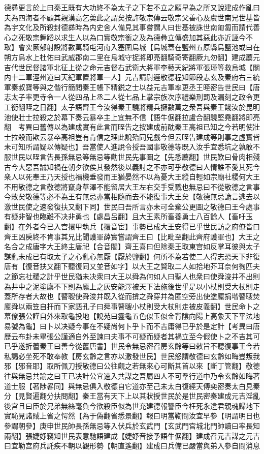 德彞更言於上曰秦王既有大功終不為太子之下若不立之願早為之所又說建成作亂曰夫為四海者不顧其親漢高乞羮此之謂矣按許敬宗傳云敬宗父善心及虞世南兄世基皆為宇文化及所殺封德彞時為内史舍人備見其事嘗謂人曰世基被誅世南匍匐而請代善心之死敬宗舞蹈以求生人以為口實敬宗銜之及為德彝立傳盛加其惡此亦近誣今不取】會突厥郁射設將數萬騎屯河南入塞圍烏城【烏城蓋在鹽州五原縣烏鹽池或曰在朔方烏水上杜佑曰武威郡南二里在烏城守捉將即亮翻騎奇寄翻厥九勿翻】建成薦元吉代世民督諸軍北征上從之命元吉督右武衛大將軍李藝天紀將軍張瑾等救烏城【關内十二軍涇州道曰天紀軍置將軍一人】元吉請尉遲敬德程知節段志玄及秦府右三統軍秦叔寶等與之偕行簡閲秦王帳下精鋭之士以益元吉軍率更丞王晊密告世民曰【唐志太子率更寺令一人從四品上丞二人從七品上掌宗族次序禮樂刑罰及漏刻之政令更工衡翻晊之日翻】太子語齊王今汝得秦王驍將精兵擁數萬之衆吾與秦王餞汝於昆明池使壯士拉殺之於幕下奏云暴卒主上宜無不信【語牛倨翻拉盧合翻驍堅堯翻將即亮翻　考異曰舊傳以為建成實有此言而晊告之按建成前酖秦王高祖已知之今若明使壯士拉殺而欺云暴卒高祖豈有肯信之理此說殆同兒戲今但云晊告建成等則事之虛實皆未可知所謂疑以傳疑也】吾當使人進說令授吾國事敬德等既入汝手宜悉坑之孰敢不服世民以晊言告長孫無忌等無忌等勸世民先事圖之【先悉薦翻】世民歎曰骨肉相殘古今大惡吾誠知禍在朝夕欲俟其發然後以義討之不亦可乎敬德曰人情誰不愛其死今衆人以死奉王乃天授也禍機垂發而王猶晏然不以為憂大王縱自輕如宗廟社稷何大王不用敬德之言敬德將竄身草澤不能留居大王左右交手受戮也無忌曰不從敬德之言事今敗矣敬德等必不為王有無忌亦當相隨而去不能復事大王矣【敬德無忌詭言逃去以激世民使之速發復扶又翻下同】世民曰吾所言亦未可全棄公更圖之敬德曰王今處事有疑非智也臨難不决非勇也【處昌呂翻】且大王素所畜養勇士八百餘人【畜吁玉翻】在外者今已入宫擐甲執兵【擐音宦】事勢已成大王安得已乎世民訪之府僚皆曰齊王凶戾終不肯事其兄比聞護軍薛實嘗謂齊王曰【比毗至翻此齊府護軍也】大王之名合之成唐字大王終主唐祀【合音閤】齊王喜曰但除秦王取東宫如反掌耳彼與太子謀亂未成已有取太子之心亂心無厭【厭於鹽翻】何所不為若使二人得志恐天下非復唐有【復音扶又翻下聽復同又並音如字】以大王之賢取二人如拾地芥耳奈何徇匹夫之節忘社稷之計乎世民猶未决衆曰大王以舜為何如人曰聖人也衆曰使舜浚井不出則為井中之泥塗廪不下則為廪上之灰安能澤被天下法施後世乎是以小杖則受大杖則走蓋所存者大故也【瞽䏂使舜浚井既入從而揜之舜穿井為匿空旁出使塗廩捐堦瞽䏂焚廩舜以兩笠自扞而下家語孔子曰舜事瞽䏂小杖則受大杖則走被皮義翻】世民命卜之幕僚張公謹自外來取龜投地【說苑曰靈龜五色似玉似金背隂向陽上高象天下平法地易號為龜】曰卜以决疑今事在不疑尚何卜乎卜而不吉庸得已乎於是定計【考異曰唐歷云布卦未畢張公謹適自外至諫曰夫事不可疑而疑者其禍立至今假使卜之不吉其可已乎遂折蓍秦王曰善今從舊唐書】世民令無忌密召房玄齡等曰敕旨不聽復事王今若私謁必坐死不敢奉教【房玄齡之言亦以激發世民】世民怒謂敬德曰玄齡如晦豈叛我邪【邪音耶】取所佩刀授敬德曰公往觀之若無來心可斷其首以來【斷丁管翻】敬德往與無忌共諭之曰王已决計公宜速入共謀之吾屬四人不可羣行道中乃令玄齡如晦著道士服【著陟畧同】與無忌俱入敬德自它道亦至己未太白復經天傅奕密奏太白見秦分【見賢遍翻分扶問翻】秦王當有天下上以其狀授世民於是世民密奏建成元吉淫亂後宫且曰臣於兄弟無絲毫負今欲殺臣似為世充建德報讐臣今枉死永違君親魂歸地下實恥見諸賊上省之愕然【為于偽翻省悉景翻】報曰明當鞫問汝宜早參【明謂明日也參謂朝參】庚申世民帥長孫無忌等入伏兵於玄武門【玄武門宫城北門帥讀曰率長知兩翻】張婕妤竊知世民表意馳語建成【婕妤音接予語牛倨翻】建成召元吉謀之元吉曰宜勒宫府兵託疾不朝以觀形勢【朝直遙翻】建成曰兵備已嚴當與弟入參自問消息